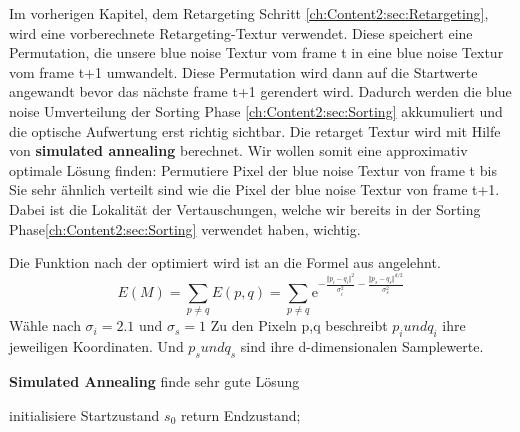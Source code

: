 Im vorherigen Kapitel, dem Retargeting Schritt \ref{ch:Content2:sec:Retargeting},
wird eine vorberechnete Retargeting-Textur verwendet. Diese speichert eine
Permutation, die unsere blue noise Textur vom frame t in eine
blue noise Textur vom frame t+1 umwandelt. Diese Permutation wird 
dann auf die Startwerte angewandt bevor das nächste frame t+1 gerendert wird.
Dadurch werden die blue noise Umverteilung der Sorting Phase \ref{ch:Content2:sec:Sorting}
akkumuliert und die optische Aufwertung erst richtig sichtbar.
Die retarget Textur wird mit Hilfe von \textbf{simulated annealing} 
\cite{hal02158423} berechnet. Wir wollen somit eine approximativ 
optimale Lösung finden: Permutiere Pixel der blue noise Textur von 
frame t bis Sie sehr ähnlich verteilt sind wie die Pixel der blue noise
Textur von frame t+1. Dabei ist die Lokalität der Vertauschungen, 
welche wir bereits in der Sorting Phase\ref{ch:Content2:sec:Sorting}
verwendet haben, wichtig.

Die Funktion nach der optimiert wird ist an die Formel aus\cite{georgiev2016blue} angelehnt.
\begin{equation}\label{eq:pixelenergyfunction}
    E(M) = \sum_{p \neq q}E(p,q) = 
           \sum_{p \neq q} \mathrm{e}^{-\frac{\Vert{p_{i}-q_{i}}\Vert^{2}}{\sigma_{i}^{2}} -
           \frac{\Vert{p_{s}-q_{s}}\Vert^{d/2}}{\sigma_{s}^{2}}}
\end{equation}
Wähle nach \cite{ulichney1993void} $\sigma_{i} = 2.1$ und $\sigma_{s} = 1$ 
Zu den Pixeln p,q beschreibt $p_{i} und q_{i}$ ihre jeweiligen Koordinaten.
Und $p_{s} und q_{s}$ sind ihre d-dimensionalen Samplewerte.


\begin{algorithm}[H]
    \caption{\textbf{Simulated Annealing} finde sehr gute Lösung}
    \begin{algorithmic}[1]
        \State initialisiere Startzustand $s_{0}$
        \State
        \EndFor
        \State return Endzustand;
    \end{algorithmic}
    \label{alg:retargeting}
\end{algorithm}
